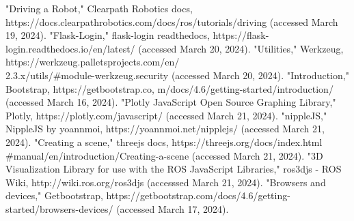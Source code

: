 \documentclass[conference]{IEEEtran}
\begin{document}
\begin{thebibliography}{00}
"Driving a Robot," Clearpath Robotics docs, https://docs.clearpathrobotics.com/docs/ros/tutorials/driving (accessed March 19, 2024).
"Flask-Login," flask-login readthedocs, https://flask-login.readthedocs.io/en/latest/ (accessed March 20, 2024).
"Utilities," Werkzeug, https://werkzeug.palletsprojects.com/en/\\2.3.x/utils/\#module-werkzeug.security (accessed March 20, 2024).
"Introduction," Bootstrap, https://getbootstrap.co, m/docs/4.6/getting-started/introduction/ (accessed March 16, 2024).
"Plotly JavaScript Open Source Graphing Library," Plotly, https://plotly.com/javascript/ (accessed March 21, 2024).
"nippleJS," NippleJS by yoannmoi, https://yoannmoi.net/nipplejs/ (accessed March 21, 2024).
"Creating a scene," threejs docs, https://threejs.org/docs/index.html\\\#manual/en/introduction/Creating-a-scene (accessed March 21, 2024).
"3D Visualization Library for use with the ROS JavaScript Libraries," ros3djs - ROS Wiki, http://wiki.ros.org/ros3djs (accesssed March 21, 2024).
"Browsers and devices," Getbootstrap, https://getbootstrap.com/docs/4.6/getting-started/browsers-devices/ (accessed March 17, 2024).
\end{thebibliography}
\vspace{12pt}
\end{document}
